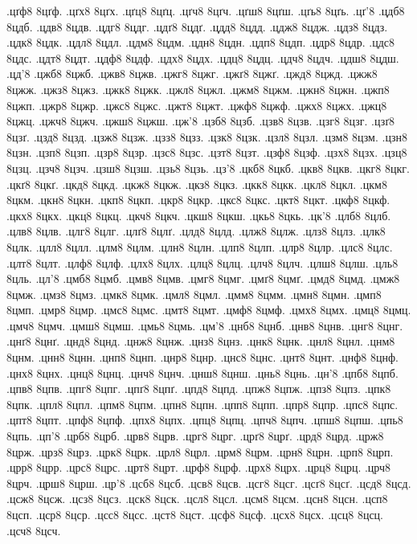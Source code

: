 {.цґф8 8цґф.
.цґх8 8цґх.
.цґц8 8цґц.
.цґч8 8цґч.
.цґш8 8цґш.
.цґь8 8цґь.
.цґ'8
.цдб8 8цдб.
.цдв8 8цдв.
.цдг8 8цдг.
.цдґ8 8цдґ.
.цдд8 8цдд.
.цдж8 8цдж.
.цдз8 8цдз.
.цдк8 8цдк.
.цдл8 8цдл.
.цдм8 8цдм.
.цдн8 8цдн.
.цдп8 8цдп.
.цдр8 8цдр.
.цдс8 8цдс.
.цдт8 8цдт.
.цдф8 8цдф.
.цдх8 8цдх.
.цдц8 8цдц.
.цдч8 8цдч.
.цдш8 8цдш.
.цд'8
.цжб8 8цжб.
.цжв8 8цжв.
.цжг8 8цжг.
.цжґ8 8цжґ.
.цжд8 8цжд.
.цжж8 8цжж.
.цжз8 8цжз.
.цжк8 8цжк.
.цжл8 8цжл.
.цжм8 8цжм.
.цжн8 8цжн.
.цжп8 8цжп.
.цжр8 8цжр.
.цжс8 8цжс.
.цжт8 8цжт.
.цжф8 8цжф.
.цжх8 8цжх.
.цжц8 8цжц.
.цжч8 8цжч.
.цжш8 8цжш.
.цж'8
.цзб8 8цзб.
.цзв8 8цзв.
.цзг8 8цзг.
.цзґ8 8цзґ.
.цзд8 8цзд.
.цзж8 8цзж.
.цзз8 8цзз.
.цзк8 8цзк.
.цзл8 8цзл.
.цзм8 8цзм.
.цзн8 8цзн.
.цзп8 8цзп.
.цзр8 8цзр.
.цзс8 8цзс.
.цзт8 8цзт.
.цзф8 8цзф.
.цзх8 8цзх.
.цзц8 8цзц.
.цзч8 8цзч.
.цзш8 8цзш.
.цзь8 8цзь.
.цз'8
.цкб8 8цкб.
.цкв8 8цкв.
.цкг8 8цкг.
.цкґ8 8цкґ.
.цкд8 8цкд.
.цкж8 8цкж.
.цкз8 8цкз.
.цкк8 8цкк.
.цкл8 8цкл.
.цкм8 8цкм.
.цкн8 8цкн.
.цкп8 8цкп.
.цкр8 8цкр.
.цкс8 8цкс.
.цкт8 8цкт.
.цкф8 8цкф.
.цкх8 8цкх.
.цкц8 8цкц.
.цкч8 8цкч.
.цкш8 8цкш.
.цкь8 8цкь.
.цк'8
.цлб8 8цлб.
.цлв8 8цлв.
.цлг8 8цлг.
.цлґ8 8цлґ.
.цлд8 8цлд.
.цлж8 8цлж.
.цлз8 8цлз.
.цлк8 8цлк.
.цлл8 8цлл.
.цлм8 8цлм.
.цлн8 8цлн.
.цлп8 8цлп.
.цлр8 8цлр.
.цлс8 8цлс.
.цлт8 8цлт.
.цлф8 8цлф.
.цлх8 8цлх.
.цлц8 8цлц.
.цлч8 8цлч.
.цлш8 8цлш.
.цль8 8цль.
.цл'8
.цмб8 8цмб.
.цмв8 8цмв.
.цмг8 8цмг.
.цмґ8 8цмґ.
.цмд8 8цмд.
.цмж8 8цмж.
.цмз8 8цмз.
.цмк8 8цмк.
.цмл8 8цмл.
.цмм8 8цмм.
.цмн8 8цмн.
.цмп8 8цмп.
.цмр8 8цмр.
.цмс8 8цмс.
.цмт8 8цмт.
.цмф8 8цмф.
.цмх8 8цмх.
.цмц8 8цмц.
.цмч8 8цмч.
.цмш8 8цмш.
.цмь8 8цмь.
.цм'8
.цнб8 8цнб.
.цнв8 8цнв.
.цнг8 8цнг.
.цнґ8 8цнґ.
.цнд8 8цнд.
.цнж8 8цнж.
.цнз8 8цнз.
.цнк8 8цнк.
.цнл8 8цнл.
.цнм8 8цнм.
.цнн8 8цнн.
.цнп8 8цнп.
.цнр8 8цнр.
.цнс8 8цнс.
.цнт8 8цнт.
.цнф8 8цнф.
.цнх8 8цнх.
.цнц8 8цнц.
.цнч8 8цнч.
.цнш8 8цнш.
.цнь8 8цнь.
.цн'8
.цпб8 8цпб.
.цпв8 8цпв.
.цпг8 8цпг.
.цпґ8 8цпґ.
.цпд8 8цпд.
.цпж8 8цпж.
.цпз8 8цпз.
.цпк8 8цпк.
.цпл8 8цпл.
.цпм8 8цпм.
.цпн8 8цпн.
.цпп8 8цпп.
.цпр8 8цпр.
.цпс8 8цпс.
.цпт8 8цпт.
.цпф8 8цпф.
.цпх8 8цпх.
.цпц8 8цпц.
.цпч8 8цпч.
.цпш8 8цпш.
.цпь8 8цпь.
.цп'8
.црб8 8црб.
.црв8 8црв.
.црг8 8црг.
.црґ8 8црґ.
.црд8 8црд.
.црж8 8црж.
.црз8 8црз.
.црк8 8црк.
.црл8 8црл.
.црм8 8црм.
.црн8 8црн.
.црп8 8црп.
.црр8 8црр.
.црс8 8црс.
.црт8 8црт.
.црф8 8црф.
.црх8 8црх.
.црц8 8црц.
.црч8 8црч.
.црш8 8црш.
.цр'8
.цсб8 8цсб.
.цсв8 8цсв.
.цсг8 8цсг.
.цсґ8 8цсґ.
.цсд8 8цсд.
.цсж8 8цсж.
.цсз8 8цсз.
.цск8 8цск.
.цсл8 8цсл.
.цсм8 8цсм.
.цсн8 8цсн.
.цсп8 8цсп.
.цср8 8цср.
.цсс8 8цсс.
.цст8 8цст.
.цсф8 8цсф.
.цсх8 8цсх.
.цсц8 8цсц.
.цсч8 8цсч.
}
